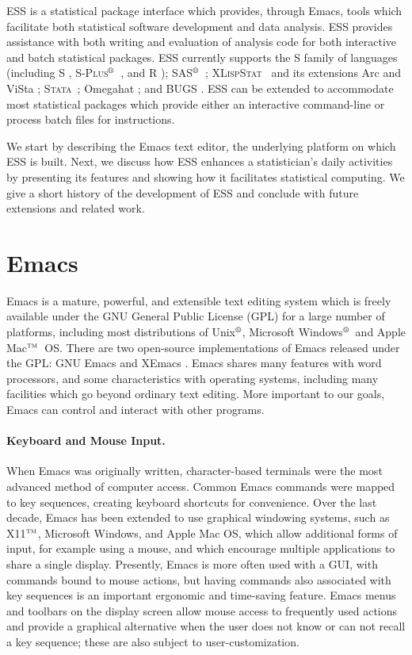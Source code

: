 \documentclass{article}
\newcommand*{\regstrd}{$^{\mbox{\scriptsize{\textregistered}}}$}
\newcommand*{\tm}{$^{\mbox{\scriptsize\sc tm}}$}
\newcommand*{\SAS}{\textsc{SAS}}
\newcommand*{\Splus}{\textsc{S-Plus}}
\newcommand*{\XLispStat}{\textsc{XLispStat}}
\newcommand*{\Stata}{\textsc{Stata}}
\begin{document}
ESS is a statistical package interface which provides, through Emacs,
tools which facilitate both statistical software development and data
analysis.  ESS provides assistance with both writing and evaluation of
analysis code for both interactive and batch statistical packages.
ESS currently supports the S family of languages (including S
\citep{BecRCW88,ChaJH92,ChaJ98}, \Splus\regstrd\ \citep{Splus}, and R
\citep{ihak:gent:1996}); \SAS\regstrd\ \citep{SAS:8}; \XLispStat\ 
\citep{Tier90} and its extensions Arc \citep{Cook:Weisberg:1999} and
ViSta \citep{youn:fald:mcfa:1992}; \Stata\ \citep{Stata:7.0}; Omegahat
\citep{DTLang:2000}; and BUGS \citep{BUGS}.  ESS can be extended to
accommodate most statistical packages which provide either an
interactive command-line or process batch files for instructions.

We start by describing the Emacs text editor, the underlying platform
on which ESS is built.  Next, we discuss how ESS enhances a
statistician's daily activities by presenting its features and showing
how it facilitates statistical computing.  We give a short history of
the development of ESS and conclude with future extensions and related
work.

\section{Emacs}
\label{sec:emacs}

Emacs is a mature, powerful, and extensible text editing system which
is freely available under the GNU General Public License (GPL) for a
large number of platforms, including most distributions of
Unix\regstrd, Microsoft Windows\regstrd\ and Apple Mac\tm\ OS.  There
are two open-source implementations of Emacs released under the GPL:
GNU Emacs \citep{GNU-Emacs} and XEmacs \citep{XEmacs}.  Emacs shares
many features with word processors, and some characteristics with
operating systems, including many facilities which go beyond ordinary
text editing.  More important to our goals, Emacs can control and
interact with other programs.

\paragraph{Keyboard and Mouse Input.}
When Emacs was originally written, character-based terminals were the
most advanced method of computer access.  Common Emacs commands were
mapped to key sequences, creating keyboard shortcuts for convenience.
Over the last decade, Emacs has been extended to use graphical
windowing systems, such as X11\tm, Microsoft Windows, and Apple Mac
OS, which allow additional forms of input, for example using a mouse,
and which encourage multiple applications to share a single display.
Presently, Emacs is more often used with a GUI, with commands bound to
mouse actions, but having commands also associated with key sequences
is an important ergonomic and time-saving feature.  Emacs menus and
toolbars on the display screen allow mouse access to frequently used
actions and provide a graphical alternative when the user does not
know or can not recall a key sequence; these are also subject to
user-customization.
\end{document}

